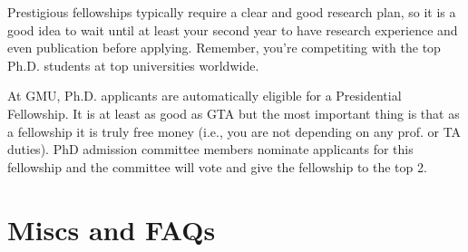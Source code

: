 \documentclass[11pt]{article}
\newenvironment{commentbox}{
 \small
    \begin{cbox}
 }{
   \end{cbox}
}
\begin{document}
Prestigious fellowships typically require a clear and good research plan, so it is a good idea to wait until at least your second year to have research experience and even publication before applying. Remember, you're competiting with the top Ph.D. students at top universities worldwide. 


\begin{commentbox}
At GMU, Ph.D. applicants are automatically eligible for a Presidential Fellowship.  It is at least as good as GTA but the most important thing is that as a fellowship it is truly free money (i.e., you are not depending on any prof. or TA duties).  PhD admission committee members nominate applicants for this fellowship and the committee will vote and give the fellowship to the top 2.
\end{commentbox}


\section{Miscs and FAQs}
\end{document}
